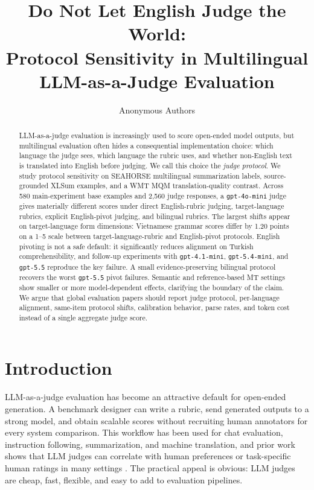 \documentclass{article}
\title{Do Not Let English Judge the World:\\Protocol Sensitivity in Multilingual LLM-as-a-Judge Evaluation}
\author{Anonymous Authors}
\date{}
\begin{document}
\ifcolmsubmission
\linenumbers
\fi

\maketitle

\begin{abstract}
LLM-as-a-judge evaluation is increasingly used to score open-ended model outputs, but multilingual evaluation often hides a consequential implementation choice: which language the judge sees, which language the rubric uses, and whether non-English text is translated into English before judging. We call this choice the \emph{judge protocol}. We study protocol sensitivity on SEAHORSE multilingual summarization labels, source-grounded XLSum examples, and a WMT MQM translation-quality contrast. Across 580 main-experiment base examples and 2,560 judge responses, a \texttt{gpt-4o-mini} judge gives materially different scores under direct English-rubric judging, target-language rubrics, explicit English-pivot judging, and bilingual rubrics. The largest shifts appear on target-language form dimensions: Vietnamese grammar scores differ by 1.20 points on a 1--5 scale between target-language-rubric and English-pivot protocols. English pivoting is not a safe default: it significantly reduces alignment on Turkish comprehensibility, and follow-up experiments with \texttt{gpt-4.1-mini}, \texttt{gpt-5.4-mini}, and \texttt{gpt-5.5} reproduce the key failure. A small evidence-preserving bilingual protocol recovers the worst \texttt{gpt-5.5} pivot failures. Semantic and reference-based MT settings show smaller or more model-dependent effects, clarifying the boundary of the claim. We argue that global evaluation papers should report judge protocol, per-language alignment, same-item protocol shifts, calibration behavior, parse rates, and token cost instead of a single aggregate judge score.
\end{abstract}

\section{Introduction}

LLM-as-a-judge evaluation has become an attractive default for open-ended generation. A benchmark designer can write a rubric, send generated outputs to a strong model, and obtain scalable scores without recruiting human annotators for every system comparison. This workflow has been used for chat evaluation, instruction following, summarization, and machine translation, and prior work shows that LLM judges can correlate with human preferences or task-specific human ratings in many settings \citep{zheng2023judging,liu2023geval,kocmi2023large}. The practical appeal is obvious: LLM judges are cheap, fast, flexible, and easy to add to evaluation pipelines.
\end{document}

